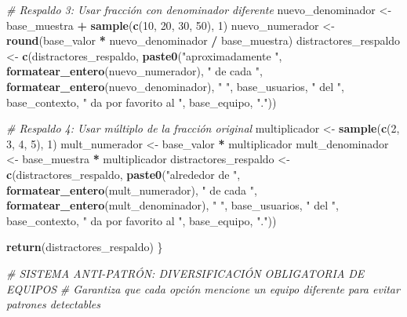 \documentclass[
]{article}
\newenvironment{Shaded}{\begin{snugshade}}{\end{snugshade}}
\newcommand{\CommentTok}[1]{\textcolor[rgb]{0.56,0.35,0.01}{\textit{#1}}}
\newcommand{\DecValTok}[1]{\textcolor[rgb]{0.00,0.00,0.81}{#1}}
\newcommand{\FunctionTok}[1]{\textcolor[rgb]{0.13,0.29,0.53}{\textbf{#1}}}
\newcommand{\NormalTok}[1]{#1}
\newcommand{\OtherTok}[1]{\textcolor[rgb]{0.56,0.35,0.01}{#1}}
\newcommand{\SpecialCharTok}[1]{\textcolor[rgb]{0.81,0.36,0.00}{\textbf{#1}}}
\newcommand{\StringTok}[1]{\textcolor[rgb]{0.31,0.60,0.02}{#1}}
\begin{document}
\begin{Shaded}
\begin{Highlighting}[]
  \CommentTok{\# Respaldo 3: Usar fracción con denominador diferente}
\NormalTok{  nuevo\_denominador }\OtherTok{\textless{}{-}}\NormalTok{ base\_muestra }\SpecialCharTok{+} \FunctionTok{sample}\NormalTok{(}\FunctionTok{c}\NormalTok{(}\DecValTok{10}\NormalTok{, }\DecValTok{20}\NormalTok{, }\DecValTok{30}\NormalTok{, }\DecValTok{50}\NormalTok{), }\DecValTok{1}\NormalTok{)}
\NormalTok{  nuevo\_numerador }\OtherTok{\textless{}{-}} \FunctionTok{round}\NormalTok{(base\_valor }\SpecialCharTok{*}\NormalTok{ nuevo\_denominador }\SpecialCharTok{/}\NormalTok{ base\_muestra)}
\NormalTok{  distractores\_respaldo }\OtherTok{\textless{}{-}} \FunctionTok{c}\NormalTok{(distractores\_respaldo,}
    \FunctionTok{paste0}\NormalTok{(}\StringTok{"aproximadamente "}\NormalTok{, }\FunctionTok{formatear\_entero}\NormalTok{(nuevo\_numerador), }\StringTok{" de cada "}\NormalTok{, }\FunctionTok{formatear\_entero}\NormalTok{(nuevo\_denominador), }\StringTok{" "}\NormalTok{,}
\NormalTok{           base\_usuarios, }\StringTok{" del "}\NormalTok{, base\_contexto, }\StringTok{" da por favorito al "}\NormalTok{, base\_equipo, }\StringTok{"."}\NormalTok{))}

  \CommentTok{\# Respaldo 4: Usar múltiplo de la fracción original}
\NormalTok{  multiplicador }\OtherTok{\textless{}{-}} \FunctionTok{sample}\NormalTok{(}\FunctionTok{c}\NormalTok{(}\DecValTok{2}\NormalTok{, }\DecValTok{3}\NormalTok{, }\DecValTok{4}\NormalTok{, }\DecValTok{5}\NormalTok{), }\DecValTok{1}\NormalTok{)}
\NormalTok{  mult\_numerador }\OtherTok{\textless{}{-}}\NormalTok{ base\_valor }\SpecialCharTok{*}\NormalTok{ multiplicador}
\NormalTok{  mult\_denominador }\OtherTok{\textless{}{-}}\NormalTok{ base\_muestra }\SpecialCharTok{*}\NormalTok{ multiplicador}
\NormalTok{  distractores\_respaldo }\OtherTok{\textless{}{-}} \FunctionTok{c}\NormalTok{(distractores\_respaldo,}
    \FunctionTok{paste0}\NormalTok{(}\StringTok{"alrededor de "}\NormalTok{, }\FunctionTok{formatear\_entero}\NormalTok{(mult\_numerador), }\StringTok{" de cada "}\NormalTok{, }\FunctionTok{formatear\_entero}\NormalTok{(mult\_denominador), }\StringTok{" "}\NormalTok{,}
\NormalTok{           base\_usuarios, }\StringTok{" del "}\NormalTok{, base\_contexto, }\StringTok{" da por favorito al "}\NormalTok{, base\_equipo, }\StringTok{"."}\NormalTok{))}

  \FunctionTok{return}\NormalTok{(distractores\_respaldo)}
\NormalTok{\}}

\CommentTok{\# SISTEMA ANTI{-}PATRÓN: DIVERSIFICACIÓN OBLIGATORIA DE EQUIPOS}
\CommentTok{\# Garantiza que cada opción mencione un equipo diferente para evitar patrones detectables}


\end{Highlighting}
\end{Shaded}
\end{document}
